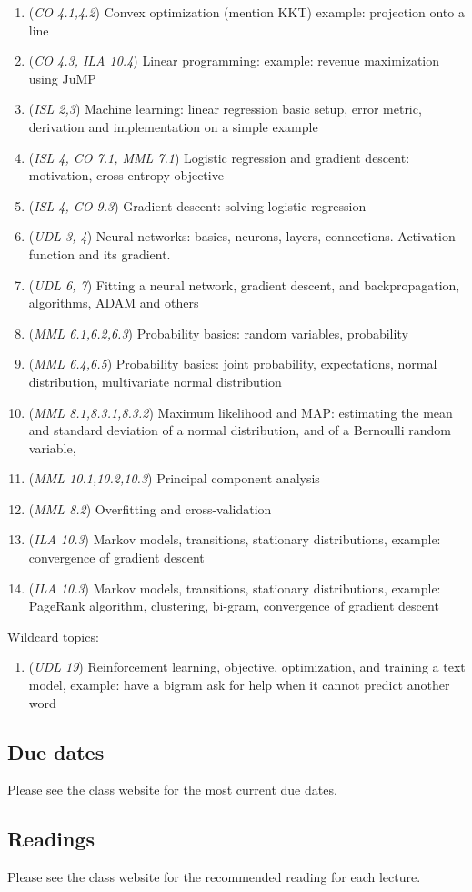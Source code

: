 \documentclass[11pt]{article}
\begin{document}
\begin{enumerate}
\item (\emph{CO 4.1,4.2}) Convex optimization (mention KKT) example: projection onto a line
\item (\emph{CO 4.3, ILA 10.4}) Linear programming: example: revenue maximization using JuMP
\item (\emph{ISL 2,3}) Machine learning: linear regression basic setup, error metric, derivation and implementation on a simple example 
\item (\emph{ISL 4, CO 7.1, MML 7.1}) Logistic regression and gradient descent: motivation, cross-entropy objective 
\item (\emph{ISL 4, CO 9.3}) Gradient descent: solving logistic regression 
\item (\emph{UDL 3, 4}) Neural networks: basics, neurons, layers, connections. Activation function and its gradient.
\item (\emph{UDL 6, 7}) Fitting a neural network, gradient descent, and backpropagation, algorithms, ADAM and others
\item (\emph{MML 6.1,6.2,6.3}) Probability basics: random variables, probability 
\item (\emph{MML 6.4,6.5}) Probability basics: joint probability, expectations, normal distribution, multivariate normal distribution 
\item (\emph{MML 8.1,8.3.1,8.3.2}) Maximum likelihood and MAP: estimating the mean and standard deviation of a normal distribution, and of a Bernoulli random variable,
\item (\emph{MML 10.1,10.2,10.3}) Principal component analysis 
\item (\emph{MML 8.2}) Overfitting and cross-validation
\item (\emph{ILA 10.3}) Markov models, transitions, stationary distributions, example: convergence of gradient descent
\item (\emph{ILA 10.3}) Markov models, transitions, stationary distributions, example: PageRank algorithm, clustering, bi-gram, convergence of gradient descent
\end{enumerate}

Wildcard topics:
\begin{enumerate}
\item (\emph{UDL 19}) Reinforcement learning, objective, optimization, and training a text model, example: have a bigram ask for help when it cannot predict another word
\end{enumerate}

\subsection{Due dates}

Please see the class website for the most current due dates.

\subsection{Readings}

Please see the class website for the recommended reading for each lecture.

\end{document}
